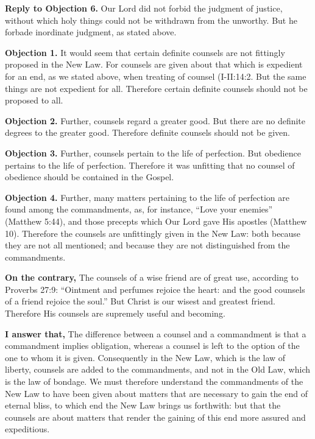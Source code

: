 \textbf{Reply to Objection 6.} Our Lord did not forbid the judgment of justice, without which holy things could not be withdrawn from the unworthy. But he forbade inordinate judgment, as stated above.


\textbf{Objection 1.} It would seem that certain definite counsels are not fittingly proposed in the New Law. For counsels are given about that which is expedient for an end, as we stated above, when treating of counsel (I-II:14:2. But the same things are not expedient for all. Therefore certain definite counsels should not be proposed to all.

\textbf{Objection 2.} Further, counsels regard a greater good. But there are no definite degrees to the greater good. Therefore definite counsels should not be given.

\textbf{Objection 3.} Further, counsels pertain to the life of perfection. But obedience pertains to the life of perfection. Therefore it was unfitting that no counsel of obedience should be contained in the Gospel.

\textbf{Objection 4.} Further, many matters pertaining to the life of perfection are found among the commandments, as, for instance, ``Love your enemies'' (Matthew 5:44), and those precepts which Our Lord gave His apostles (Matthew 10). Therefore the counsels are unfittingly given in the New Law: both because they are not all mentioned; and because they are not distinguished from the commandments.

\textbf{On the contrary,} The counsels of a wise friend are of great use, according to Proverbs 27:9: ``Ointment and perfumes rejoice the heart: and the good counsels of a friend rejoice the soul.'' But Christ is our wisest and greatest friend. Therefore His counsels are supremely useful and becoming.

\textbf{I answer that,} The difference between a counsel and a commandment is that a commandment implies obligation, whereas a counsel is left to the option of the one to whom it is given. Consequently in the New Law, which is the law of liberty, counsels are added to the commandments, and not in the Old Law, which is the law of bondage. We must therefore understand the commandments of the New Law to have been given about matters that are necessary to gain the end of eternal bliss, to which end the New Law brings us forthwith: but that the counsels are about matters that render the gaining of this end more assured and expeditious.

